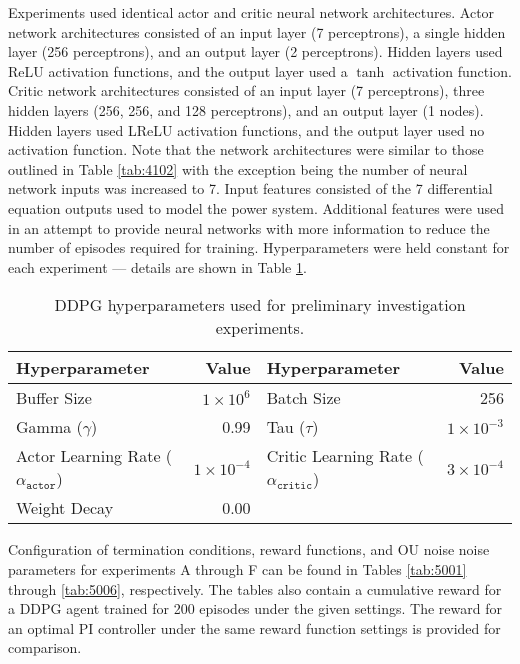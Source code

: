 Experiments used identical actor and critic neural network architectures. Actor network architectures consisted of an input layer (7 perceptrons), a single hidden layer (256 perceptrons), and an output layer (2 perceptrons). Hidden layers used ReLU activation functions, and the output layer used a $\tanh$ activation function. Critic network architectures consisted of an input layer (7 perceptrons), three hidden layers (256, 256, and 128 perceptrons), and an output layer (1 nodes). Hidden layers used LReLU activation functions, and the output layer used no activation function. Note that the network architectures were similar to those outlined in Table \ref{tab:4102} with the exception being the number of neural network inputs was increased to 7. Input features consisted of the 7 differential equation outputs used to model the power system. Additional features were used in an attempt to provide neural networks with more information to reduce the number of episodes required for training. Hyperparameters were held constant for each experiment --- details are shown in Table \ref{tab:5000_hyperparameters}.

\begin{table}[h]
	\centering
	\caption{DDPG hyperparameters used for preliminary investigation experiments.}
	\begin{tabular}{lrlr}
	\toprule
	\textbf{Hyperparameter} & \textbf{Value} & \textbf{Hyperparameter} & \textbf{Value} \\
	\midrule
	Buffer Size 	 & $1 \times 10^6$  & Batch Size 	& 256 \\
	Gamma ($\gamma$) & 0.99 	& Tau ($\tau$) 	& $1 \times 10^{-3}$ \\
	Actor Learning Rate ($\alpha_{\texttt{actor}}$) & $1 \times 10^{-4}$ & Critic Learning Rate ($\alpha_{\texttt{critic}}$) & $3 \times 10^{-4} $ \\
	Weight Decay & 0.00 & & \\
	\bottomrule
	\end{tabular}\label{tab:5000_hyperparameters}
\end{table}

Configuration of termination conditions, reward functions, and OU noise noise parameters for experiments A through F can be found in Tables \ref{tab:5001} through \ref{tab:5006}, respectively. The tables also contain a cumulative reward for a DDPG agent trained for 200 episodes under the given settings. The reward for an optimal PI controller under the same reward function settings is provided for comparison. 

